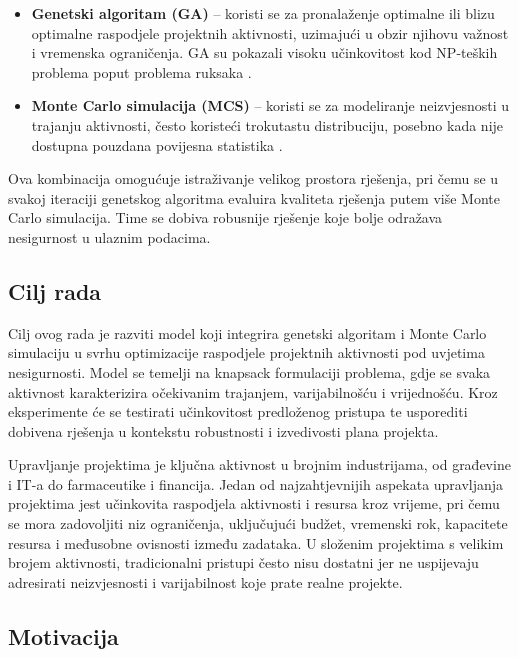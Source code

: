 \begin{itemize}
    \item \textbf{Genetski algoritam (GA)} – koristi se za pronalaženje optimalne ili blizu optimalne raspodjele projektnih aktivnosti, uzimajući u obzir njihovu važnost i vremenska ograničenja. GA su pokazali visoku učinkovitost kod NP-teških problema poput problema ruksaka \cite{Goldberg1989, Mitchell1998}.
    \item \textbf{Monte Carlo simulacija (MCS)} – koristi se za modeliranje neizvjesnosti u trajanju aktivnosti, često koristeći trokutastu distribuciju, posebno kada nije dostupna pouzdana povijesna statistika \cite{Law2015}.
\end{itemize}

Ova kombinacija omogućuje istraživanje velikog prostora rješenja, pri čemu se u svakoj iteraciji genetskog algoritma evaluira kvaliteta rješenja putem više Monte Carlo simulacija. Time se dobiva robusnije rješenje koje bolje odražava nesigurnost u ulaznim podacima.

\subsection{Cilj rada}

Cilj ovog rada je razviti model koji integrira genetski algoritam i Monte Carlo simulaciju u svrhu optimizacije raspodjele projektnih aktivnosti pod uvjetima nesigurnosti. Model se temelji na knapsack formulaciji problema, gdje se svaka aktivnost karakterizira očekivanim trajanjem, varijabilnošću i vrijednošću. Kroz eksperimente će se testirati učinkovitost predloženog pristupa te usporediti dobivena rješenja u kontekstu robustnosti i izvedivosti plana projekta.


Upravljanje projektima je ključna aktivnost u brojnim industrijama, od građevine i IT-a do farmaceutike i financija. Jedan od najzahtjevnijih aspekata upravljanja projektima jest učinkovita raspodjela aktivnosti i resursa kroz vrijeme, pri čemu se mora zadovoljiti niz ograničenja, uključujući budžet, vremenski rok, kapacitete resursa i međusobne ovisnosti između zadataka. U složenim projektima s velikim brojem aktivnosti, tradicionalni pristupi često nisu dostatni jer ne uspijevaju adresirati neizvjesnosti i varijabilnost koje prate realne projekte.

\subsection{Motivacija}

